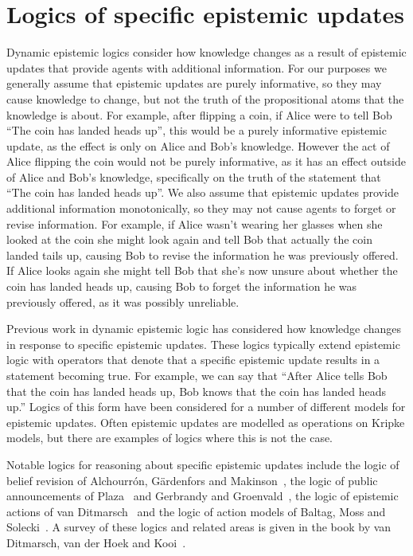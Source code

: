 \section{Logics of specific epistemic updates}

Dynamic epistemic logics consider how knowledge changes as a result of epistemic updates that provide agents with additional information.
For our purposes we generally assume that epistemic updates are purely informative, so they may cause knowledge to change, but not the truth of the propositional atoms that the knowledge is about.
For example, after flipping a coin, if Alice were to tell Bob ``The coin has landed heads up'', this would be a purely informative epistemic update, as the effect is only on Alice and Bob's knowledge.
However the act of Alice flipping the coin would not be purely informative, as it has an effect outside of Alice and Bob's knowledge, specifically on the truth of the statement that ``The coin has landed heads up''.
We also assume that epistemic updates provide additional information monotonically, so they may not cause agents to forget or revise information.
For example, if Alice wasn't wearing her glasses when she looked at the coin she might look again and tell Bob that actually the coin landed tails up, causing Bob to revise the information he was previously offered.
If Alice looks again she might tell Bob that she's now unsure about whether the coin has landed heads up, causing Bob to forget the information he was previously offered, as it was possibly unreliable.

Previous work in dynamic epistemic logic has considered how knowledge changes in response to specific epistemic updates.
These logics typically extend epistemic logic with operators that denote that a specific epistemic update results in a statement becoming true.
For example, we can say that ``After Alice tells Bob that the coin has landed heads up, Bob knows that the coin has landed heads up.''
Logics of this form have been considered for a number of different models for epistemic updates.
Often epistemic updates are modelled as operations on Kripke models, but there are examples of logics where this is not the case.

Notable logics for reasoning about specific epistemic updates include the logic of belief revision of Alchourr{\'o}n, G{\"a}rdenfors and Makinson~\cite{alchourron:1985}, the logic of public announcements of Plaza~\cite{plaza:1989} and Gerbrandy and Groenvald~\cite{gerbrandy:1997}, the logic of epistemic actions of van Ditmarsch~\cite{vanditmarsch:1999, vanditmarsch:2000, vanditmarsch:2002} and the logic of action models of Baltag, Moss and Solecki~\cite{baltag:1999, baltag:2004}.
A survey of these logics and related areas is given in the book by van Ditmarsch, van der Hoek and Kooi~\cite{vanditmarsch:2007}.


